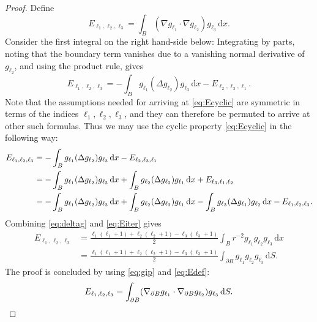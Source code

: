 \documentclass[10pt,a4paper]{amsart}
\newcommand{\di}{\mathrm{d}}   %
\begin{document}
\begin{proof}
    Define
    \begin{equation} \label{eq:Edef}
        E_{\ell_1,\ell_2,\ell_3} = \int_{B} (\nabla g_{\ell_1} \cdot \nabla g_{\ell_2}) g_{\ell_3} \, \di x.
    \end{equation}
    Consider the first integral on the right hand-side below: Integrating by parts, noting that the boundary term vanishes due to a vanishing normal derivative of $g_{\ell_2}$, and using the product rule, gives
    \begin{equation} \label{eq:Ecyclic}
        E_{\ell_1,\ell_2,\ell_3} = -\int_B g_{\ell_1}(\Delta g_{\ell_2})g_{\ell_3}\,\di x - E_{\ell_2,\ell_3,\ell_1}.
    \end{equation}
    Note that the assumptions needed for arriving at \eqref{eq:Ecyclic} are symmetric in terms of the indices $\ell_1,\ell_2,\ell_3$, and they can therefore be permuted to arrive at other such formulas. Thus we may use the cyclic property \eqref{eq:Ecyclic} in the following way:
    \begin{align}
        E_{\ell_1,\ell_2,\ell_3} &= -\int_B g_{\ell_1}(\Delta g_{\ell_2})g_{\ell_3}\,\di x - E_{\ell_2,\ell_3,\ell_1} \notag \\
   		&= -\int_B g_{\ell_1}(\Delta g_{\ell_2})g_{\ell_3}\,\di x + \int_B g_{\ell_2}(\Delta g_{\ell_3})g_{\ell_1}\,\di x + E_{\ell_3,\ell_1,\ell_2} \notag \\
   		&= -\int_B g_{\ell_1}(\Delta g_{\ell_2})g_{\ell_3}\,\di x + \int_B g_{\ell_2}(\Delta g_{\ell_3})g_{\ell_1}\,\di x - \int_B g_{\ell_3}(\Delta g_{\ell_1})g_{\ell_2}\,\di x - E_{\ell_1,\ell_2,\ell_3}. \label{eq:Eiter}
    \end{align}
    Combining \eqref{eq:deltag} and \eqref{eq:Eiter} gives
    \begin{align*}
        E_{\ell_1,\ell_2,\ell_3} &= \frac{\ell_1 (\ell_1 + 1) + \ell_2 (\ell_2 + 1) - \ell_3 (\ell_3 + 1)}{2} \int_{B} r^{-2}g_{\ell_1} g_{\ell_2} g_{\ell_3} \, \di x \\
   		&= \frac{\ell_1 (\ell_1 + 1) + \ell_2 (\ell_2 + 1) - \ell_3 (\ell_3 + 1)}{2} \int_{\partial B} g_{\ell_1} g_{\ell_2} g_{\ell_3} \, \di S.
    \end{align*}    	
    The proof is concluded by using \eqref{eq:gip} and \eqref{eq:Edef}:
    \begin{equation*}
        E_{\ell_1,\ell_2,\ell_3} = \int_{\partial B} (\nabla_{\partial B} g_{\ell_1} \cdot \nabla_{\partial B} g_{\ell_2}) g_{\ell_3} \, \di S. \qedhere
    \end{equation*}
\end{proof}
\end{document}

